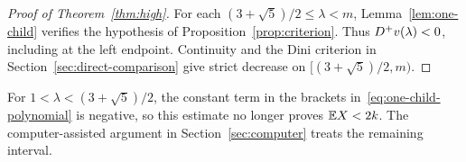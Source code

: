 \begin{proof}[Proof of Theorem~\ref{thm:high}]
For each $(3+\sqrt5)/2\le\lambda<m$, Lemma~\ref{lem:one-child} verifies the hypothesis of Proposition~\ref{prop:criterion}. Thus $D^{+} v(\lambda)<0$, including at the left endpoint. Continuity and the Dini criterion in Section~\ref{sec:direct-comparison} give strict decrease on $[(3+\sqrt5)/2,m)$.
\end{proof}

For $1<\lambda<(3+\sqrt5)/2$, the constant term in the brackets in~\eqref{eq:one-child-polynomial} is negative, so this estimate no longer proves $\mathbb E X<2k$. The computer-assisted argument in Section~\ref{sec:computer} treats the remaining interval.
